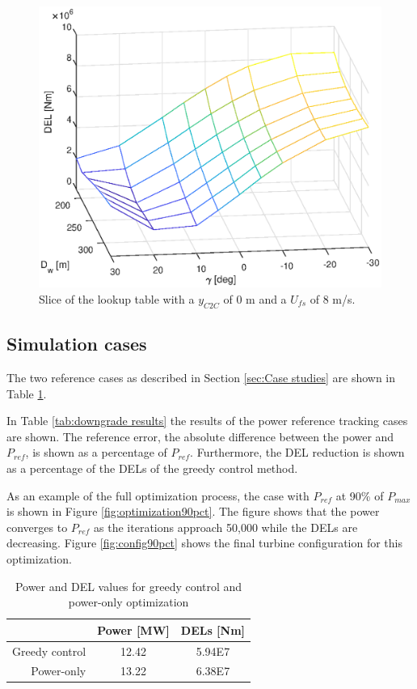 \begin{figure}
	\includegraphics[width=\linewidth]{./Figures/LUTslice_yWake0_Ufs8.eps}
	\caption{Slice of the lookup table with a $y_{C2C}$ of 0 m and a $U_{fs}$ of 8 m/s. }
	\label{fig:LUTsliceDw}
\end{figure}

\subsection{Simulation cases} \label{sec:Simulation cases}
The two reference cases as described in Section \ref{sec:Case studies} are shown in Table \ref{tab:reference results}. 

In Table \ref{tab:downgrade results} the results of the power reference tracking cases are shown. The reference error, the absolute difference between the power and $P_{ref}$, is shown as a percentage of $P_{ref}$. Furthermore, the DEL reduction is shown as a percentage of the DELs of the greedy control method. 

As an example of the full optimization process, the case with $P_{ref}$ at 90\% of $P_{max}$ is shown in Figure \ref{fig:optimization90pct}. The figure shows that the power converges to $P_{ref}$ as the iterations approach 50,000 while the DELs are decreasing. Figure \ref{fig:config90pct} shows the final turbine configuration for this optimization. 

\begin{table}
	\caption{Power and DEL values for greedy control and power-only optimization}
	\centering
	\label{tab:reference results}
	\begin{tabular}{rcc}
		\hline
		& Power [MW] & DELs [Nm] \\ 
		\hline
		Greedy control & 12.42 & 5.94E7 \\
		Power-only & 13.22 & 6.38E7 \\
		\hline
	\end{tabular}
\end{table}

